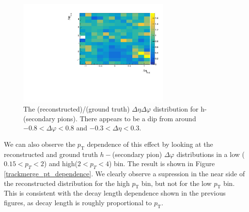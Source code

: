 \documentclass[ALICE,manyauthors]{ALICE_analysis_notes}
\begin{document}
\begin{figure}[ht]
\centering
\includegraphics[width=3in]{figures/h_secondary_pi_mc_ratio.pdf}
\caption{The  (reconstructed)/(ground truth)  $\Delta\eta\Delta\varphi$  distribution for h-(secondary pions). There appears to be a dip from around $-0.8 < \Delta\varphi < 0.8$ and $-0.3 < \Delta\eta < 0.3$.}
\label{h_secondary_pi_mc_ratio}
\end{figure}

We can also observe the $p_\text{T}$ dependence of this effect by looking at the reconstructed and ground truth $h-$(secondary pion) $\Delta\varphi$ distributions in a low ($0.15 < p_{T} < 2$) and high($2 < p_{T} < 4$) bin. The result is shown in Figure \ref{trackmerge_pt_dependence}. We clearly observe a supression in the near side of the reconstructed distribution for the high $p_\text{T}$ bin, but not for the low $p_\text{T}$ bin.  This is consistent with the decay length dependence shown in the previous figures, as decay length is roughly proportional to $p_\text{T}$.
\end{document}
